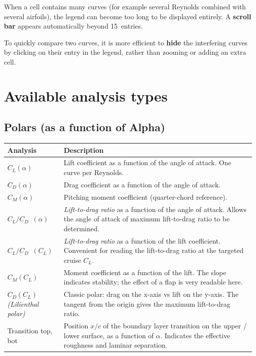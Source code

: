 When a cell contains many curves (for example
several Reynolds combined with several airfoils), the legend can
become too long to be displayed entirely. A \textbf{scroll
bar} appears automatically beyond 15~entries.

\begin{astuce}
To quickly compare two curves, it is more efficient
to \textbf{hide} the interfering curves by clicking on their
entry in the legend, rather than zooming or adding
an extra cell.
\end{astuce}

\section{Available analysis types}

\subsection{Polars (as a function of Alpha)}

\begin{tabularx}{\linewidth}{l X}
    \toprule
    \textbf{Analysis} & \textbf{Description} \\
    \midrule
    $C_L(\alpha)$  & Lift coefficient as a function of
                     the angle of attack. One curve per Reynolds.\\
    $C_D(\alpha)$  & Drag coefficient as a function of
                     the angle of attack.\\
    $C_M(\alpha)$  & Pitching moment coefficient
                     (quarter-chord reference).\\
    $C_L/C_D$~$(\alpha)$ & \emph{Lift-to-drag ratio} as a function of
                     the angle of attack. Allows the
                     angle of attack of maximum lift-to-drag ratio to be determined.\\
    $C_L/C_D$~$(C_L)$ & \emph{Lift-to-drag ratio} as a function of the lift
                     coefficient. Convenient for reading the lift-to-drag ratio at
                     the targeted cruise $C_L$.\\
    $C_M(C_L)$     & Moment coefficient as a function of the
                     lift. The slope indicates stability;
                     the effect of a flap is very readable here.\\
    $C_D(C_L)$ \emph{(Lilienthal polar)}
                   & Classic polar: drag on the x-axis
                     vs lift on the y-axis. The tangent
                     from the origin gives the maximum lift-to-drag ratio.\\
    Transition top, bot
                   & Position $x/c$ of the boundary layer
                     transition on the upper / lower surface, as a function
                     of $\alpha$. Indicates the effective
                     roughness and laminar separation.\\
    \bottomrule
\end{tabularx}

